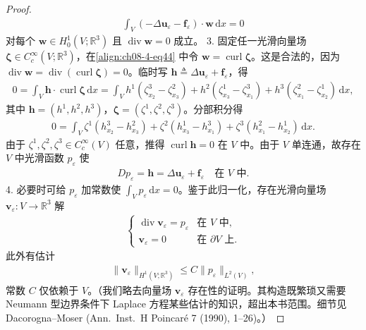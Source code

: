 \documentclass[../../main.tex]{subfiles}
\begin{document}
\begin{theorem}
\begin{proof}
\begin{align}
\int_V(-\Delta\mathbf{u}_\varepsilon-\mathbf{f}_\varepsilon)\cdot\mathbf{w}\,\mathrm{d}x=0\label{align:ch08-4-eq44}
\end{align}
对每个 $\mathbf{w}\in H_0^1(V;\mathbb{R}^3)$ 且 $\operatorname{div}\mathbf{w}=0$ 成立。
3. 固定任一光滑向量场 $\boldsymbol{\zeta}\in C_c^\infty(V;\mathbb{R}^3)$，在\eqref{align:ch08-4-eq44} 中令 $\mathbf{w}=\operatorname{curl}\boldsymbol{\zeta}$。这是合法的，因为 $\operatorname{div}\mathbf{w}=\operatorname{div}(\operatorname{curl}\boldsymbol{\zeta})=0$。临时写 $\mathbf{h}\triangleq\Delta\mathbf{u}_\varepsilon+\mathbf{f}_\varepsilon$，得
\begin{align*}
0=\int_V\mathbf{h}\cdot\operatorname{curl}\boldsymbol{\zeta}\,\mathrm{d}x=\int_V h^1(\zeta^3_{x_2}-\zeta^2_{x_3})+h^2(\zeta^1_{x_3}-\zeta^3_{x_1})+h^3(\zeta^2_{x_1}-\zeta^1_{x_2})\,\mathrm{d}x,
\end{align*}
其中 $\mathbf{h}=(h^1,h^2,h^3)$，$\boldsymbol{\zeta}=(\zeta^1,\zeta^2,\zeta^3)$。分部积分得
\begin{align*}
0=\int_V\zeta^1(h^3_{x_2}-h^2_{x_3})+\zeta^2(h^1_{x_3}-h^3_{x_1})+\zeta^3(h^2_{x_1}-h^1_{x_2})\,\mathrm{d}x.
\end{align*}
由于 $\zeta^1,\zeta^2,\zeta^3\in C_c^\infty(V)$ 任意，推得 $\operatorname{curl}\mathbf{h}=0$ 在 $V$ 中。由于 $V$ 单连通，故存在 $V$ 中光滑函数 $p_\varepsilon$ 使
\begin{align}
Dp_\varepsilon=\mathbf{h}=\Delta\mathbf{u}_\varepsilon+\mathbf{f}_\varepsilon\quad\text{在 }V\text{ 中}.\label{align:ch08-4-eq45}
\end{align}
4. 必要时可给 $p_\varepsilon$ 加常数使 $\int_V p_\varepsilon\,\mathrm{d}x=0$。鉴于此归一化，存在光滑向量场 $\mathbf{v}_\varepsilon:V\to\mathbb{R}^3$ 解
\begin{align}
\begin{cases}
\operatorname{div}\mathbf{v}_\varepsilon=p_\varepsilon&\text{在 }V\text{ 中},\\
\mathbf{v}_\varepsilon=0&\text{在 }\partial V\text{ 上}.
\end{cases}\label{align:ch08-4-eq46}
\end{align}
此外有估计
\begin{align}
\|\mathbf{v}_\varepsilon\|_{H^1(V;\mathbb{R}^3)}\leqslant C\|p_\varepsilon\|_{L^2(V)},\label{align:ch08-4-eq47}
\end{align}
常数 $C$ 仅依赖于 $V$。（我们略去向量场 $\mathbf{v}_\varepsilon$ 存在性的证明。其构造既繁琐又需要 Neumann 型边界条件下 Laplace 方程某些估计的知识，超出本书范围。细节见 Dacorogna--Moser (Ann.\ Inst.\ H Poincaré 7 (1990), 1--26)。）

\end{proof}
\end{theorem}
\end{document}
